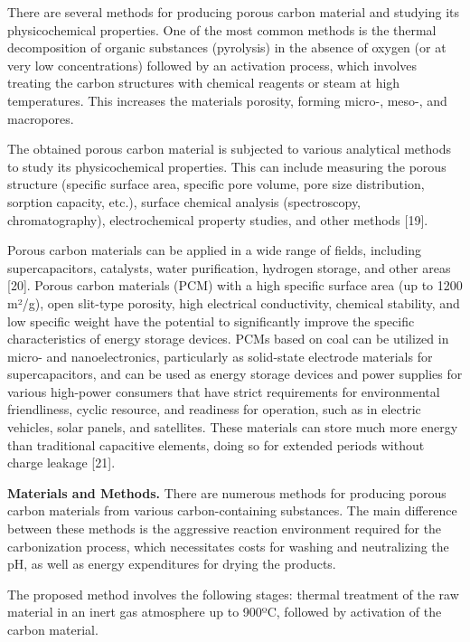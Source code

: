 There are several methods for producing porous carbon material and
studying its physicochemical properties. One of the most common methods
is the thermal decomposition of organic substances (pyrolysis) in the
absence of oxygen (or at very low concentrations) followed by an
activation process, which involves treating the carbon structures with
chemical reagents or steam at high temperatures. This increases the
material\textquotesingle s porosity, forming micro-, meso-, and
macropores.

The obtained porous carbon material is subjected to various analytical
methods to study its physicochemical properties. This can include
measuring the porous structure (specific surface area, specific pore
volume, pore size distribution, sorption capacity, etc.), surface
chemical analysis (spectroscopy, chromatography), electrochemical
property studies, and other methods {[}19{]}.

Porous carbon materials can be applied in a wide range of fields,
including supercapacitors, catalysts, water purification, hydrogen
storage, and other areas {[}20{]}. Porous carbon materials (PCM) with a
high specific surface area (up to 1200 m²/g), open slit-type porosity,
high electrical conductivity, chemical stability, and low specific
weight have the potential to significantly improve the specific
characteristics of energy storage devices. PCMs based on coal can be
utilized in micro- and nanoelectronics, particularly as solid-state
electrode materials for supercapacitors, and can be used as energy
storage devices and power supplies for various high-power consumers that
have strict requirements for environmental friendliness, cyclic
resource, and readiness for operation, such as in electric vehicles,
solar panels, and satellites. These materials can store much more energy
than traditional capacitive elements, doing so for extended periods
without charge leakage {[}21{]}.

{\bfseries Materials and Methods.} There are numerous methods for producing
porous carbon materials from various carbon-containing substances. The
main difference between these methods is the aggressive reaction
environment required for the carbonization process, which necessitates
costs for washing and neutralizing the pH, as well as energy
expenditures for drying the products.

The proposed method involves the following stages: thermal treatment of
the raw material in an inert gas atmosphere up to 900ºC, followed by
activation of the carbon material.

